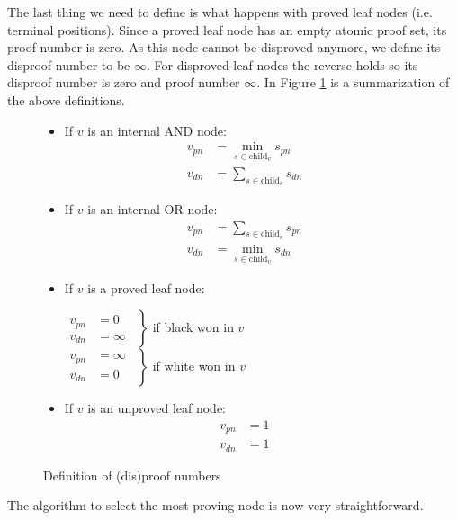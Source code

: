 \documentclass{article}
\begin{document}
The last thing we need to define is what happens with proved leaf nodes (i.e. terminal positions). Since a proved leaf node has an empty atomic proof set,
its proof number is zero. As this node cannot be disproved anymore, we define its disproof number to be $\infty$. For disproved leaf nodes the reverse holds
so its disproof number is zero and proof number $\infty$. In Figure \ref{pn:def} is a summarization of the above definitions.
\begin{figure}
\begin{itemize}
  \item If $v$ is an internal AND node:
    \begin{align*}
      v_{pn} &= \min_{s \in \text{child}_v} s_{pn}\\
      v_{dn} &= \sum_{s \in \text{child}_v} s_{dn}
    \end{align*}
  \item If $v$ is an internal OR node:
    \begin{align*}
      v_{pn} &= \sum_{s \in \text{child}_v} s_{pn}\\
      v_{dn} &= \min_{s \in \text{child}_v} s_{dn}
    \end{align*}
  \item If $v$ is a proved leaf node:
    \begin{center}
      $\left.
      \begin{aligned}
        v_{pn} &= 0 \quad \\
        v_{dn} &= \infty
      \end{aligned}
      \right\}$ if black won in $v$\\
      \hspace{0.7mm}$\left.
      \begin{aligned}
        v_{pn} &= \infty \\
        v_{dn} &= 0 \quad
      \end{aligned}
      \right\}$ if white won in $v$
    \end{center}
  \item If $v$ is an unproved leaf node:
    \begin{align*}
      v_{pn} &= 1 \\
      v_{dn} &= 1
    \end{align*}
\end{itemize}
\caption{Definition of (dis)proof numbers}
\label{pn:def}
\end{figure}

The algorithm to select the most proving node is now very straightforward.
\end{document}
